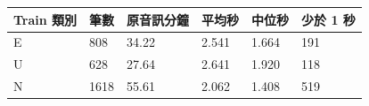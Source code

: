 \begin{tabular}{llllll}
\toprule
Train 類別 & 筆數 & 原音訊分鐘 & 平均秒 & 中位秒 & 少於 1 秒\\
\midrule
E & 808 & 34.22 & 2.541 & 1.664 & 191\\
U & 628 & 27.64 & 2.641 & 1.920 & 118\\
N & 1618 & 55.61 & 2.062 & 1.408 & 519\\
\bottomrule
\end{tabular}
